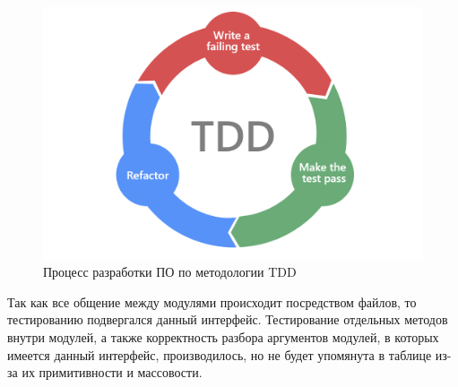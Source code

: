 \begin{figure}[!hbtp]
    \includegraphics[width=\textwidth,height=\textheight,keepaspectratio]{images/TDD.png}
    \caption{Процесс разработки ПО по методологии TDD\label{fig:tdd}}
\end{figure}

Так как все общение между модулями происходит посредством файлов, то тестированию
подвергался данный интерфейс. Тестирование отдельных методов внутри модулей,
а также корректность разбора аргументов модулей,
в которых имеется данный интерфейс, производилось, но не будет упомянута
в таблице из-за их примитивности и массовости.

